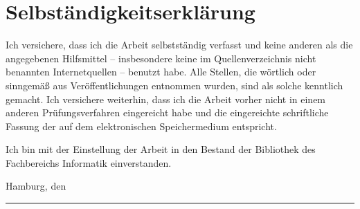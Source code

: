 \documentclass[
    12pt,
    headings=small,
    parskip=half,           %
    bibliography=totoc,
    numbers=noenddot,       %
    open=any,               %
    final                   %
    ]{scrreprt}
\begin{document}











\chapter*{Selbständigkeitserklärung}
\vspace{1cm}

Ich versichere, dass ich die Arbeit selbstständig verfasst und keine anderen als die angegebenen Hilfsmittel -- insbesondere keine im Quellenverzeichnis nicht benannten Internetquellen -- benutzt habe. Alle Stellen, die wörtlich oder sinngemäß aus Veröffentlichungen entnommen wurden, sind als solche kenntlich gemacht. Ich versichere weiterhin, dass ich die Arbeit vorher nicht in einem anderen Prüfungsverfahren eingereicht habe und die eingereichte schriftliche Fassung der auf dem elektronischen Speichermedium entspricht.

Ich bin mit der Einstellung der Arbeit in den Bestand der Bibliothek des Fachbereichs Informatik einverstanden.

\makeatletter
Hamburg, den {\@date}
\makeatother

\vspace{2cm}
\rule{6cm}{0.25pt}\\
\makeatletter
{\@author} \par
\makeatother


\listoftodos
\end{document}
